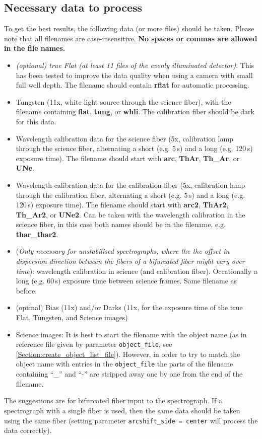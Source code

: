\documentclass[10pt,a4paper]{article}
\begin{document}
\subsection{Necessary data to process}

To get the best results, the following data (or more files) should be taken. Please note that all filenames are case-insensitive. \textbf{No spaces or commas are allowed in the file names.}
\begin{itemize}
  \item \textit{(optional) true Flat (at least 11 files of the evenly illuminated detector)}. This has been tested to improve the data quality when using a camera with small full well depth. The filename should contain \textbf{rflat} for automatic processing.
  \item Tungsten (11x, white light source through the science fiber), with the filename containing \textbf{flat}, \textbf{tung}, or \textbf{whli}. The calibration fiber should be dark for this data.
  \item Wavelength calibration data for the science fiber (5x, calibration lamp through the science fiber, alternating a short (e.g. 5\,s) and a long (e.g. 120\,s) exposure time). The filename should start with \textbf{arc}, \textbf{ThAr}, \textbf{Th\_Ar}, or \textbf{UNe}.
  \item Wavelength calibration data for the calibration fiber (5x, calibration lamp through the calibration fiber, alternating a short (e.g. 5\,s) and a long (e.g. 120\,s) exposure time). The filename should start with \textbf{arc2}, \textbf{ThAr2}, \textbf{Th\_Ar2}, or \textbf{UNe2}. Can be taken with the wavelength calibration in the science fiber, in this case both names should be in the filename, e.g.  \textbf{thar\_thar2}.
  \item (\textit{Only necessary for unstabilised spectrographs, where the the offset in dispersion direction between the fibers of a bifurcated fiber might vary over time}): wavelength calibration in science (and calibration fiber). Occationally a long (e.g. 60\,s) exposure time between science frames. Same filename as before.
  \item (optinal) Bias (11x) and/or Darks (11x, for the exposure time of the true Flat, Tungsten, and Science images)%
  \item Science images: It is best to start the filename with the object name (as in reference file given by parameter \verb|object_file|, see \ref{Section:create_object_list_file}). However, in order to try to match the object name with entries in the \verb|object_file| the parts of the filename containing ``\_'' and ``-'' are stripped away one by one from the end of the filename.
\end{itemize}
The suggestions are for bifurcated fiber input to the spectrograph. If a spectrograph with a single fiber is used, then the same data should be taken using the same fiber (setting parameter \verb|arcshift_side = center| will process the data correctly).
\end{document}
